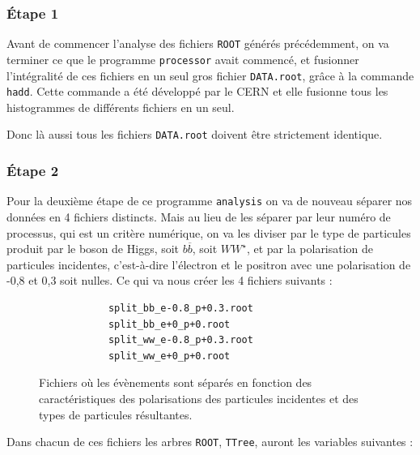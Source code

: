 \documentclass[10pt,a4paper]{report}
\newcommand{\cad}{c'est-à-dire\xspace}
\newcommand{\ROOT}{\texttt{ROOT}\xspace}
\newcommand{\processor}{\texttt{processor}\xspace}
\newcommand{\analysis}{\texttt{analysis}\xspace}
\newcommand{\bbar}{\overline{b}}
\newcommand{\Wstar}{W^{\star}}
\begin{document}
\subsubsection{Étape 1}

Avant de commencer l'analyse des fichiers \ROOT générés précédemment, on va terminer ce que le programme \processor avait commencé, et fusionner l'intégralité de ces fichiers en un seul gros fichier \texttt{DATA.root}, grâce à la commande \texttt{hadd}. 
Cette commande a été développé par le CERN et elle fusionne tous les histogrammes de différents fichiers en un seul. 

Donc là aussi tous les fichiers \texttt{DATA.root} doivent être strictement identique.

\subsubsection{Étape 2}

Pour la deuxième étape de ce programme \analysis on va de nouveau séparer nos données en 4 fichiers distincts. 
Mais au lieu de les séparer par leur numéro de processus, qui est un critère numérique, on va les diviser par le type de particules produit par le boson de Higgs, soit $b\bbar$, soit $W\Wstar$, et par la polarisation de particules incidentes, \cad l'électron et le positron avec une polarisation de -0,8 et 0,3 soit nulles.
Ce qui va nous créer les 4 fichiers suivants :

\begin{figure}[h!]
	\centering
	\begin{lstlisting}
			split_bb_e-0.8_p+0.3.root
			split_bb_e+0_p+0.root
			split_ww_e-0.8_p+0.3.root
			split_ww_e+0_p+0.root
	\end{lstlisting}
	\label{files:split}
	\caption{Fichiers où les évènements sont séparés en fonction des caractéristiques des polarisations des particules incidentes et des types de particules résultantes.}
\end{figure}

Dans chacun de ces fichiers les arbres \ROOT, \texttt{TTree}, auront les variables suivantes :
\end{document}
